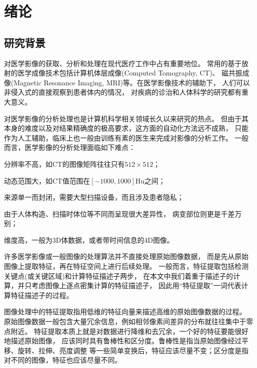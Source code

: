 
\chapter{绪论\label{chap:intro}}

\section{研究背景}
对医学影像的获取、分析和处理在现代医疗工作中占有重要地位。
常用的基于放射的医学成像技术包括计算机体层成像(Computed Tomography, CT)、
磁共振成像(Magnetic Resonance Imaging, MRI)等。在医学影像技术的辅助下，
人们可以非侵入式的直接观察到患者体内的情况，
对疾病的诊治和人体科学的研究都有重大意义。

对医学影像的分析处理也是计算机科学相关领域长久以来研究的热点。
但由于其本身的难度以及对结果精确度的极高要求，这方面的自动化方法远不成熟，
只能作为人工辅助，临床上也一般由训练有素的医生来完成对影像的分析工作。
一般而言，医学影像的分析处理面临如下难点：
\begin{inparaenum}[(1)]
    \item 分辨率不高，如CT的图像矩阵往往只有$512\times 512$\cite{medimging2}；
    \item 动态范围大，如CT值范围在$[-1000,1000]$Hu之间\cite{medimging2}；
    \item 来源单一而封闭，需要大型扫描设备，而且涉及患者隐私；
    \item 由于人体构造、扫描时体位等不同而呈现很大差异性，
        病变部位则更是千差万别；
    \item 维度高，一般为3D体数据，或者带时间信息的4D图像。
\end{inparaenum}

许多医学影像或一般图像的处理算法并不直接处理原始图像数据，
而是先从原始图像上提取特征，再在特征空间上进行后续处理。
一般而言，特征提取包括检测关键点(或关键区域)和计算特征描述子两步，
在本文中我们着重于描述子的计算，并只考虑图像上逐点密集计算的特征描述子，
因此用``特征提取''一词代表计算特征描述子的过程。

图像处理中的特征提取指用低维的特征向量来描述高维的原始图像数据的过程。
原始图像数据一般包含大量冗余信息，例如相邻像素间差异的分布就往往集中于零点附近。
特征提取本质上就是对数据进行降维和去冗余，一个好的特征要能很好地描述原始图像，
应该同时具有鲁棒性和区分度。鲁棒性是指当原始图像经过平移、旋转、拉伸、亮度调整
等一些简单变换后，特征应该尽量不变；区分度是指对不同的图像，特征也应该尽量不同。

